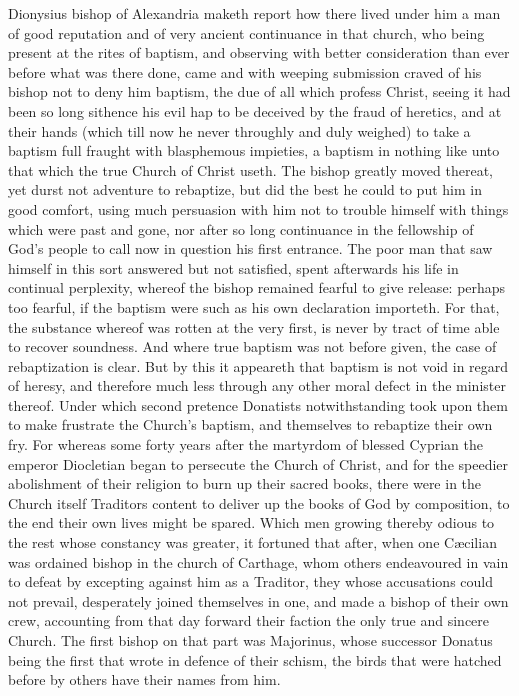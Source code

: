 Dionysius bishop of Alexandria maketh report how there lived under him a man of good reputation and of very ancient continuance in that church, who being present at the rites of baptism, and observing with better consideration than ever before what was there done, came and with weeping submission craved of his bishop not to deny him baptism, the  due of all which profess Christ, seeing it had been so long sithence his evil hap to be deceived by the fraud of heretics, and at their hands (which till now he never throughly and duly weighed) to take a baptism full fraught with blasphemous impieties, a baptism in nothing like unto that which the true Church of Christ useth. The bishop greatly moved thereat, yet durst not adventure to rebaptize, but did the best he could to put him in good comfort, using much persuasion with him not to trouble himself with things which were past and gone, nor after so long continuance in the fellowship of God’s people to call now in question his first entrance. The poor man that saw himself in this sort answered but not satisfied, spent afterwards his life in continual perplexity, whereof the bishop remained fearful to give release: perhaps too fearful, if the baptism were such as his own declaration importeth. For that, the substance whereof was rotten at the very first, is never by tract of time able to recover soundness. And where true baptism was not before given, the case of rebaptization is clear.
But by this it appeareth that baptism is not void in regard of heresy, and therefore much less through any other moral defect in the minister thereof. Under which second pretence Donatists notwithstanding took upon them to make frustrate the Church’s baptism, and themselves to rebaptize their own fry. For whereas some forty years after the martyrdom of blessed Cyprian the emperor Diocletian began to persecute the Church of Christ, and for the speedier abolishment of their religion to burn up their sacred books, there were in the Church itself Traditors content to deliver up the books of God by composition, to the end their own lives might be spared. Which men growing thereby odious to the rest whose constancy was greater, it fortuned that after, when one Cæcilian was ordained bishop in the church of Carthage, whom others endeavoured in vain to defeat by excepting against him as a Traditor, they whose accusations could not prevail, desperately joined themselves in one, and made a bishop of their own crew, accounting from that day forward their faction the only true and sincere Church. The  first bishop on that part was Majorinus, whose successor Donatus being the first that wrote in defence of their schism, the birds that were hatched before by others have their names from him.
